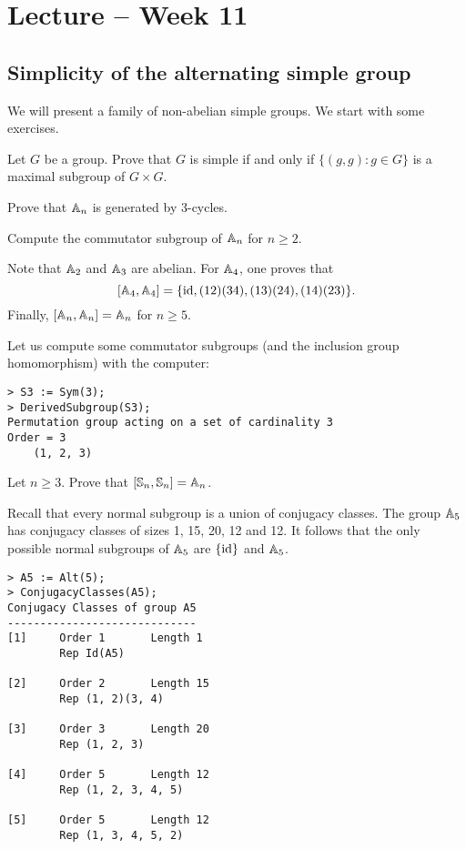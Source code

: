 \section{Lecture -- Week 11}

\subsection{Simplicity of the alternating simple group}

We will present a family of non-abelian simple groups. 
We start with some exercises. 

\begin{exercise}
\label{xca:diagonal}
    Let $G$ be a group. 
    Prove that $G$ is simple if and only if 
    $\{(g,g):g\in G\}$ 
    is a maximal subgroup of $G\times G$. 
\end{exercise}

\begin{exercise}
    Prove that $\mathbb{A}_n$ is generated by 3-cycles. 
\end{exercise}

\begin{exercise}
    Compute the commutator subgroup of $\mathbb{A}_n$ for
    $n\geq2$. 
\end{exercise}

Note that $\mathbb{A}_2$ and $\mathbb{A}_3$ are abelian. 
For $\mathbb{A}_4$, one proves that 
\[
[\mathbb{A}_4,\mathbb{A}_4]=\{\operatorname{id},(12)(34),(13)(24),(14)(23)\}.
\]
Finally, $[\mathbb{A}_n,\mathbb{A}_n]=\mathbb{A}_n$ for $n\geq5$. 

Let us compute some commutator subgroups (and the inclusion group homomorphism)  
with the computer:
\begin{lstlisting}
> S3 := Sym(3);
> DerivedSubgroup(S3);
Permutation group acting on a set of cardinality 3
Order = 3
    (1, 2, 3)   
\end{lstlisting}

\begin{exercise}
    Let $n\geq3$. 
    Prove that $[\mathbb{S}_n,\mathbb{S}_n]=\mathbb{A}_n$. 
\end{exercise}

Recall that every normal subgroup is a union of conjugacy classes. The group 
$\mathbb{A}_5$ has conjugacy classes of sizes 1, 15, 20, 12 and 12. It follows that 
the only possible normal subgroups of $\mathbb{A}_5$ are $\{\operatorname{id}\}$ and $\mathbb{A}_5$. 
\begin{lstlisting}
> A5 := Alt(5);
> ConjugacyClasses(A5);
Conjugacy Classes of group A5
-----------------------------
[1]     Order 1       Length 1
        Rep Id(A5)

[2]     Order 2       Length 15
        Rep (1, 2)(3, 4)

[3]     Order 3       Length 20
        Rep (1, 2, 3)

[4]     Order 5       Length 12
        Rep (1, 2, 3, 4, 5)

[5]     Order 5       Length 12
        Rep (1, 3, 4, 5, 2)
\end{lstlisting}

